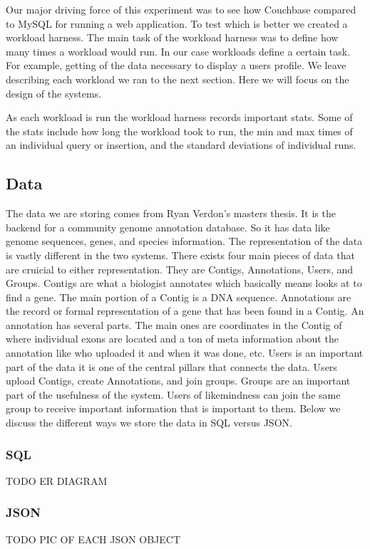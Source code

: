 \documentclass[]{IEEEtran}
\begin{document}
Our major driving force of this experiment was to see how Couchbase compared to MySQL for running a web application. To test which is better we created a workload harness. The main task of the workload harness was to define how many times a workload would run. In our case workloads define a certain task. For example, getting of the data necessary to display a users profile. We leave describing each workload we ran to the next section. Here we will focus on the design of the systems. 

As each workload is run the workload harness records important stats. Some of the stats include how long the workload took to run, the min and max times of an individual query or insertion, and the standard deviations of individual runs.

\subsection{Data}
The data we are storing comes from Ryan Verdon's masters thesis. It is the backend for a community genome annotation database. So it has data like genome sequences, genes, and species information. The representation of the data is vastly different in the two systems. There exists four main pieces of data that are cruicial to either representation. They are Contigs, Annotations, Users, and Groups. Contigs are what a biologist annotates which basically means looks at to find a gene. The main portion of a Contig is a DNA sequence. Annotations are the record or formal representation of a gene that has been found in a Contig. An annotation has several parts. The main ones are coordinates in the Contig of where individual exons are located and a ton of meta information about the annotation like who uploaded it and when it was done, etc. Users is an important part of the data it is one of the central pillars that connects the data. Users upload Contigs, create Annotations, and join groups. Groups are an important part of the usefulness of the system. Users of likemindness can join the same group to receive important information that is important to them. Below we discuss the different ways we store the data in SQL versus JSON.

\subsubsection{SQL}
TODO
ER DIAGRAM

\subsubsection{JSON}
TODO
PIC OF EACH JSON OBJECT 
\end{document}

